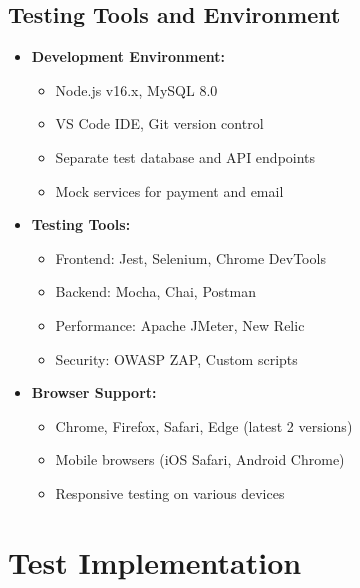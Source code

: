 \subsection{Testing Tools and Environment}
\begin{itemize}
    \item \textbf{Development Environment:}
    \begin{itemize}
        \item Node.js v16.x, MySQL 8.0
        \item VS Code IDE, Git version control
        \item Separate test database and API endpoints
        \item Mock services for payment and email
    \end{itemize}
    
    \item \textbf{Testing Tools:}
    \begin{itemize}
        \item Frontend: Jest, Selenium, Chrome DevTools
        \item Backend: Mocha, Chai, Postman
        \item Performance: Apache JMeter, New Relic
        \item Security: OWASP ZAP, Custom scripts
    \end{itemize}
    
    \item \textbf{Browser Support:}
    \begin{itemize}
        \item Chrome, Firefox, Safari, Edge (latest 2 versions)
        \item Mobile browsers (iOS Safari, Android Chrome)
        \item Responsive testing on various devices
    \end{itemize}
\end{itemize}

\section{Test Implementation}
